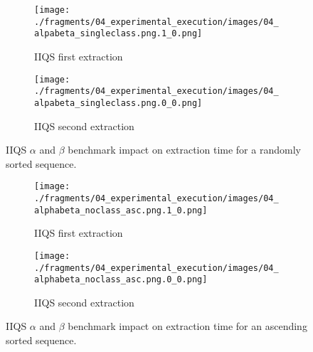 
\begin{figure}
    \centering
    \begin{subfigure}[b]{0.45\textwidth}
        \centering
        \texttt{[image: ./fragments/04\_experimental\_execution/images/04\_alpabeta\_singleclass.png.1\_0.png]}
        \caption{IIQS first extraction}
        \label{FIG:05_ALPHABETA_RELATIONSHIP_RANDOM__0_0}
    \end{subfigure}
    \hfill
    \begin{subfigure}[b]{0.45\textwidth}
        \centering
        \texttt{[image: ./fragments/04\_experimental\_execution/images/04\_alpabeta\_singleclass.png.0\_0.png]}
        \caption{IIQS second extraction}
        \label{FIG:05_ALPHABETA_RELATIONSHIP_RANDOM__0_1}
    \end{subfigure}

    \caption{IIQS $\alpha$ and $\beta$ benchmark impact on extraction time for a randomly sorted sequence.}
    \label{FIG:05_ALPHABETA_RELATIONSHIP_RANDOM}
\end{figure}

\begin{figure}
    \centering
    \begin{subfigure}[b]{0.45\textwidth}
        \centering
        \texttt{[image: ./fragments/04\_experimental\_execution/images/04\_alphabeta\_noclass\_asc.png.1\_0.png]}
        \caption{IIQS first extraction}
        \label{FIG:05_ALPHABETA_RELATIONSHIP_ASC__0_0}
    \end{subfigure}
    \hfill
    \begin{subfigure}[b]{0.45\textwidth}
        \centering
        \texttt{[image: ./fragments/04\_experimental\_execution/images/04\_alphabeta\_noclass\_asc.png.0\_0.png]}
        \caption{IIQS second extraction}
        \label{FIG:05_ALPHABETA_RELATIONSHIP_ASC__0_1}
    \end{subfigure}

    \caption{IIQS $\alpha$ and $\beta$ benchmark impact on extraction time for an ascending sorted sequence.}
    \label{FIG:05_ALPHABETA_RELATIONSHIP_ASC}
\end{figure}


